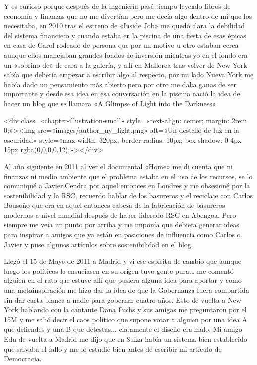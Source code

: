 \documentclass[12pt,twoside,openany]{book}
\begin{document}
Y es curioso porque después de la ingeniería pasé tiempo leyendo libros de economía y finanzas que no me divertían pero me decía algo dentro de mi que los necesitaba, en 2010 tras el estreno de «Inside Job» me quedó clara la debilidad del sistema financiero y cuando estaba en la piscina de una fiesta de esas épicas en casa de Carol rodeado de persona que por un motivo u otro estaban cerca aunque ellos manejaban grandes fondos de inversión mientras yo en el fondo era un «sobrino de» de cara a la galería, y allí en Mallorca tras volver de New York sabía que debería empezar a escribir algo al respecto, por un lado Nueva York me había dado un pensamiento más abierto pero por otro me daba ganas de ser importante y desde esa idea en esa conversación en la piscina nació la idea de hacer un blog que se llamara «A Glimpse of Light into the Darkness»

<div class=«chapter-illustration-small» style=«text-align: center; margin: 2rem 0;»><img src=«images/author_ny_light.png» alt=«Un destello de luz en la oscuridad» style=«max-width: 320px; border-radius: 10px; box-shadow: 0 4px 15px rgba(0,0,0,0.12);»></div>

Al año siguiente en 2011 al ver el documental «Home» me di cuenta que ni finanzas ni medio ambiente que el problema estaba en el uso de los recursos, se lo comuniqué a Javier Cendra por aquel entonces en Londres y me obsesioné por la sostenibilidad y la RSC, recuerdo hablar de los basureros y el reciclaje con Carlos Bousoño que era en aquel entonces cabeza de la fabricación de basureros modernos a nivel mundial después de haber liderado RSC en Abengoa. Pero siempre me veía un punto por arriba y me imponía que debiera generar ideas para inspirar a amigos que ya están en posiciones de influencia como Carlos o Javier y puse algunos artículos sobre sostenibilidad en el blog.

Llegó el 15 de Mayo de 2011 a Madrid y vi ese espíritu de cambio que aunque luego los políticos lo ensuciasen en su origen tuvo gente pura... me comentó alguien en el rato que estuve allí que pusiera alguna idea para aportar y como una metainspiración me hizo dar la idea de que la Gobernanza fuera compartida sin dar carta blanca a nadie para gobernar cuatro años. Esto de vuelta a New York hablando con la cantante Dana Fuchs y sus amigas me preguntaron por el 15M y me salió decir el caos político que supone votar a alguien por una idea A que defiendes y una B que detestas... claramente el diseño era malo. Mi amigo Edu de vuelta a Madrid me dijo que en Suiza había un sistema bien establecido que salvaba el fallo y me lo estudié bien antes de escribir mi artículo de Democracia.
\end{document}
